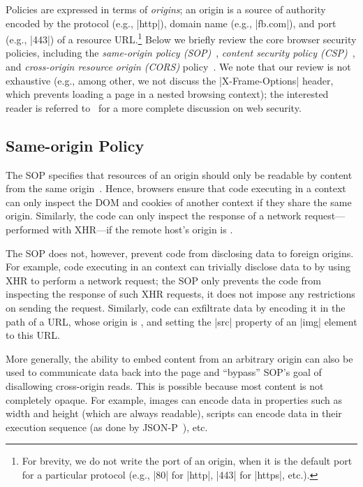 Policies are expressed in terms of \emph{origins}; an origin is a
source of authority encoded by the protocol (e.g., \js|http|), domain
name (e.g., \js|fb.com|), and port (e.g., \js|443|) of a resource
URL.\footnote{
  For brevity, we do not write the port of an origin, when it is the
  default port for a particular protocol (e.g., \js|80| for \js|http|,
  \js|443| for \js|https|, etc.).
}
%
Below we briefly review the core browser security policies, including
the \emph{same-origin policy (SOP)}~\cite{rfc6454}, \emph{content security
policy (CSP)}~\cite{csp}, and \emph{cross-origin resource origin
(CORS)} policy~\cite{cors13}.
%
%
We note that our review is not exhaustive (e.g., among other, we not
discuss the \js|X-Frame-Options| header, which prevents loading a page
in a nested browsing context);  the interested reader is referred
to~\cite{googlehandbook} for a more complete discussion on web security.



\subsection{Same-origin Policy}
\label{sec:background:sop}

The SOP specifies that resources of an origin should only be readable
by content from the same origin~\cite{rfc6454, googlehandbook,
VanKesteren2012}.
%
Hence, browsers ensure that code executing in a  context
can only inspect the DOM and cookies of another context if they share
the same origin.
%
Similarly, the code can only inspect the response of a network
request---performed with XHR---if the remote host's origin is
.
%
 
The SOP does not, however, prevent code from disclosing data to
foreign origins.
%
For example, code executing in an  context can trivially
disclose data to  by using XHR to perform a network
request; the SOP only prevents the code from inspecting the response
of such XHR requests, it does not impose any restrictions on sending
the request.
%
Similarly, code can exfiltrate data by encoding it in the path of a
URL, whose origin is , and setting the \js|src| property
of an \js|img| element to this URL.

More generally, the ability to embed content from an arbitrary origin
can also be used to communicate data back into the page and ``bypass''
SOP's goal of disallowing cross-origin reads.
%
This is possible because most content is not completely opaque. 
%
For example, images can encode data in properties such as width and
height (which are always readable), scripts can encode data in their
execution sequence (as done by JSON-P~\cite{jsonp}), etc.
%

